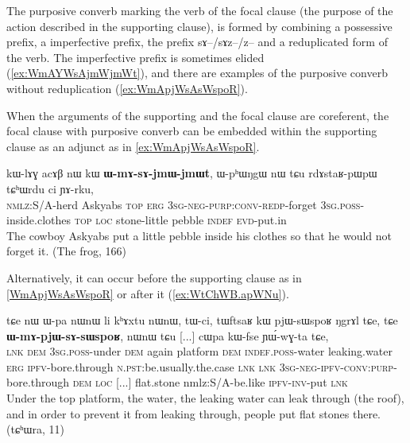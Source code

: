 \documentclass[oldfontcommands,oneside,a4paper,11pt]{article}
\newcommand{\ipa}[1]{{\phon \mbox{#1}}} %
\begin{document}
The purposive converb marking the verb of the focal clause (the purpose of the action described in the supporting clause), is formed by combining a possessive prefix, a imperfective prefix, the prefix \ipa{sɤ}--/\ipa{sɤz}--/\ipa{z}-- and a reduplicated form of the verb. The imperfective prefix is sometimes elided (\ref{ex:WmAYWsAjmWjmWt}), and there are examples of the purposive converb without reduplication (\ref{ex:WmApjWsAsWspoR}).

When the arguments of the supporting and the focal clause are coreferent, the focal clause with purposive converb can be embedded within the supporting clause as an adjunct as in \ref{ex:WmApjWsAsWspoR}.
%
\begin{exe}
\ex \label{ex:WmAYWsAjmWjmWt}
\gll
  \ipa{kɯ-lɤɣ}   	\ipa{acɤβ}   	\ipa{nɯ}   	\ipa{kɯ}   	\ipa{\textbf{ɯ-mɤ-sɤ-jmɯ-jmɯt}},   	\ipa{ɯ-pʰɯŋgɯ}   	\ipa{nɯ}   	\ipa{tɕu}   	\ipa{rdɤstaʁ-pɯpɯ}   	\ipa{tɕʰɯrdu}   	\ipa{ci}  \ipa{ɲɤ-rku,}\\
 \textsc{nmlz}:S/A-herd Askyabs \textsc{top} \textsc{erg}  \textsc{3sg-neg-purp:conv-redp}-forget \textsc{3sg.poss}-inside.clothes \textsc{top} \textsc{loc} stone-little pebble \textsc{indef}
 \textsc{evd}-put.in\\
\glt The cowboy Askyabs put a little pebble inside his clothes so that he would not forget it. (The frog, 166)
\end{exe}
 
Alternatively, it can occur   before the supporting clause as in \ref{WmApjWsAsWspoR} or after it (\ref{ex:WtChWB.apWNu}).

\begin{exe}
\ex \label{ex:WmApjWsAsWspoR}
\gll
\ipa{tɕe}   	\ipa{nɯ}   	\ipa{ɯ-pa}   	\ipa{nɯnɯ}   	\ipa{li}   	\ipa{kʰɤxtu}   	\ipa{nɯnɯ,}   	\ipa{tɯ-ci,}   	\ipa{tɯftsaʁ}   	\ipa{kɯ}   	\ipa{pjɯ-sɯspoʁ}   	\ipa{ŋgrɤl}   	\ipa{tɕe,}    \ipa{tɕe}   	\ipa{\textbf{ɯ-mɤ-pjɯ-sɤ-sɯspoʁ},}   	\ipa{nɯnɯ}   	\ipa{tɕu}   [...] \ipa{cɯpa}   	\ipa{kɯ-fse}   	\ipa{ɲɯ́-wɣ-ta}   	\ipa{tɕe,}   \\
\textsc{lnk} \textsc{dem} \textsc{3sg.poss}-under \textsc{dem} again platform \textsc{dem} \textsc{indef.poss}-water leaking.water \textsc{erg} \textsc{ipfv}-bore.through \textsc{n.pst}:be.usually.the.case \textsc{lnk} \textsc{lnk} \textsc{3sg-neg-ipfv-conv:purp}-bore.through \textsc{dem} \textsc{loc} [...] flat.stone nm\textsc{}lz:S/A-be.like \textsc{ipfv-inv}-put \textsc{lnk} \\
\glt Under the top platform, the water, the leaking water can leak through (the roof), and in order to prevent it from leaking through, people put flat stones there. (tɕʰɯra, 11)
\end{exe}
\end{document}
